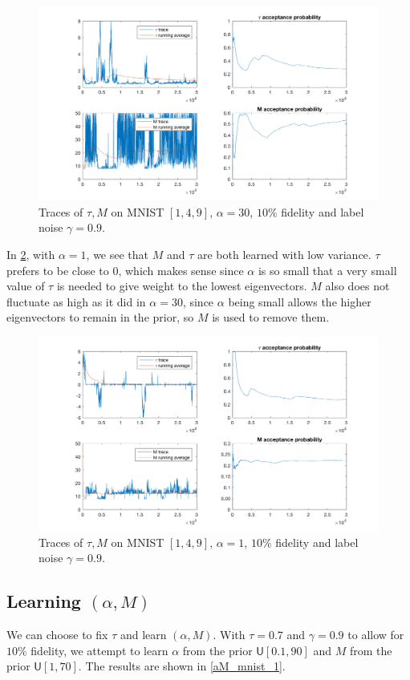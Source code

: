 \documentclass{siamart1116}
\begin{document}
        \begin{figure}[!htb]
        \centering
        \caption{\label{tM_mnist_1}Traces of $\tau, M$ on MNIST $[1, 4, 9]$, $\alpha = 30$, $10\%$ fidelity and label noise $\gamma = 0.9$.}
        \includegraphics[width=0.8\linewidth]{choose_hyp/t_M/alpha=30.png}
        \end{figure}

        In \cref{tM_mnist_2}, with $\alpha=1$, we see that $M$ and $\tau$ are both learned with low variance. $\tau$ prefers to be close to $0$, which makes sense since $\alpha$ is so small that a very small value of $\tau$ is needed to give weight to the lowest eigenvectors. $M$ also does not fluctuate as high as it did in $\alpha=30$, since $\alpha$ being small allows the higher eigenvectors to remain in the prior, so $M$ is used to remove them.

        \begin{figure}[!htb]
        \centering
        \caption{\label{tM_mnist_2}Traces of $\tau, M$ on MNIST $[1, 4, 9]$, $\alpha = 1$, $10\%$ fidelity and label noise $\gamma = 0.9$.}
        \includegraphics[width=0.8\linewidth]{choose_hyp/t_M/alpha=1.png}
        \end{figure}

    \subsection{Learning $(\alpha, M)$}
        We can choose to fix $\tau$ and learn $(\alpha, M)$. With $\tau=0.7$ and $\gamma=0.9$ to allow for $10\%$ fidelity, we attempt to learn $\alpha$ from the prior $\mathsf{U}[0.1, 90]$ and $M$ from the prior $\mathsf{U}[1,70]$. The results are shown in \cref{aM_mnist_1}.
\end{document}
